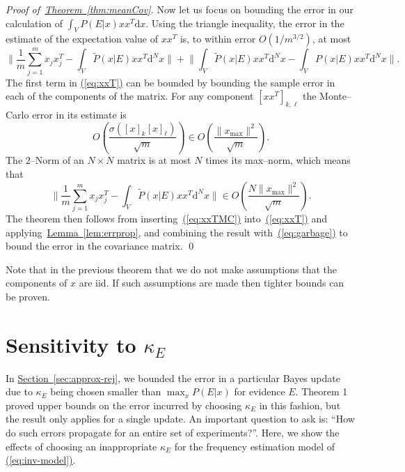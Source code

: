 \documentclass[twoside]{article}
\newenvironment{proofof}[1]{\begin{trivlist}\item[]{\flushleft\it
Proof of~#1.}}
{\qed\end{trivlist}}
\newcommand{\eq}[1]{\hyperref[eq:#1]{(\ref*{eq:#1})}}
\renewcommand{\sec}[1]{\hyperref[sec:#1]{Section~\ref*{sec:#1}}}
\newcommand{\thm}[1]{\hyperref[thm:#1]{Theorem~\ref*{thm:#1}}}
\newcommand{\lem}[1]{\hyperref[lem:#1]{Lemma~\ref*{lem:#1}}}
\begin{document}
\begin{proofof}{\thm{meanCov}}
Now let us focus on bounding the error in our calculation of $\int_V P(E|x) xx^T \mathrm{d}x$. Using the triangle inequality, the error in the estimate of the expectation value of $x x^T$ is, to within error $O(1/m^{3/2})$, at most
\begin{equation}
\Biggr\|\frac{1}{m} \sum_{j=1}^m x_j x_j^T - \int_V \tilde{P}(x|E) x x^T\mathrm{d}^Nx\Biggr\|+\Biggr\| \int_V \tilde{P}(x|E) x x^T\mathrm{d}^Nx-\int_V {P}(x|E) x x^T\mathrm{d}^Nx\Biggr\|.\label{eq:xxT}
\end{equation}
The first term in \eq{xxT} can be bounded by bounding the sample error in each of the components of the matrix.  For any component $[xx^T]_{k,\ell}$ the Monte--Carlo error in its estimate is
\begin{equation}
O\left(\frac{\sigma({[x]_k[x]_\ell})}{\sqrt{m}}\right)\in O\left(\frac{\|x_{\max}\|^2}{\sqrt{m}}\right).
\end{equation}
The $2$--Norm of an $N\times N$ matrix is at most $N$ times its max--norm, which means that
\begin{equation}
\Biggr\|\frac{1}{m} \sum_{j=1}^m x_j x_j^T - \int_V \tilde{P}(x|E) x x^T\mathrm{d}^Nx\Biggr\|\in O\left(\frac{N\|x_{\max}\|^2}{\sqrt{m}}\right).\label{eq:xxTMC}
\end{equation}
The theorem then follows from inserting~\eq{xxTMC} into~\eq{xxT} and applying~\lem{errprop}, and combining the result with~\eq{garbage} to bound the error in the covariance matrix.
\end{proofof}

Note that in the previous theorem that we do not make assumptions that the components of $x$ are iid.  If such assumptions are made then tighter bounds can be proven.

\section{Sensitivity to $\kappa_E$}
\label{app:sensitivity-kappa}

In \sec{approx-rej}, we bounded the error in a particular Bayes update due to
$\kappa_E$ being chosen smaller than $\max_x P(E|x)$ for evidence $E$. 
Theorem 1 proved upper bounds on the error incurred by choosing $\kappa_E$ in this fashion,
but the result only applies for a single update.  An important question to ask is: ``How do such errors propagate for an entire set of experiments?''. 
Here, we show the effects of choosing an inappropriate $\kappa_E$
for the frequency estimation model of \eq{inv-model}. 
\end{document}
